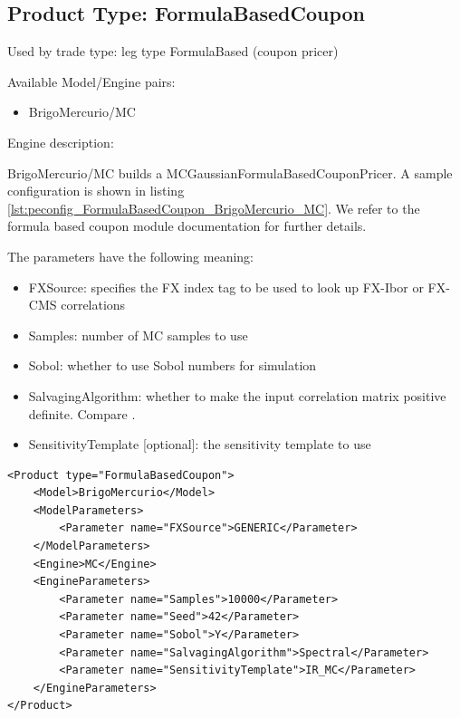 \subsection{Product Type: FormulaBasedCoupon}

Used by trade type: leg type FormulaBased (coupon pricer)

Available Model/Engine pairs:

\begin{itemize}
\item BrigoMercurio/MC
\end{itemize}

Engine description:

BrigoMercurio/MC builds a MCGaussianFormulaBasedCouponPricer. A sample configuration is shown in listing
\ref{lst:peconfig_FormulaBasedCoupon_BrigoMercurio_MC}. We refer to the formula based coupon module documentation for
further details.

The parameters have the following meaning:

\begin{itemize}
\item FXSource: specifies the FX index tag to be used to look up FX-Ibor or FX-CMS correlations
\item Samples: number of MC samples to use
\item Sobol: whether to use Sobol numbers for simulation
\item SalvagingAlgorithm: whether to make the input correlation matrix positive definite. Compare \cite{corrSalv}.
\item SensitivityTemplate [optional]: the sensitivity template to use
\end{itemize}

\begin{longlisting}
\begin{verbatim}
<Product type="FormulaBasedCoupon">
    <Model>BrigoMercurio</Model>
    <ModelParameters>
        <Parameter name="FXSource">GENERIC</Parameter>
    </ModelParameters>
    <Engine>MC</Engine>
    <EngineParameters>
        <Parameter name="Samples">10000</Parameter>
        <Parameter name="Seed">42</Parameter>
        <Parameter name="Sobol">Y</Parameter>
        <Parameter name="SalvagingAlgorithm">Spectral</Parameter>
        <Parameter name="SensitivityTemplate">IR_MC</Parameter>
    </EngineParameters>
</Product>
\end{verbatim}
\caption{Configuration for Product FormulaBasedCoupon, Model BrigoMercurio, Engine MC}
\label{lst:peconfig_FormulaBasedCoupon_BrigoMercurio_MC}
\end{longlisting}

